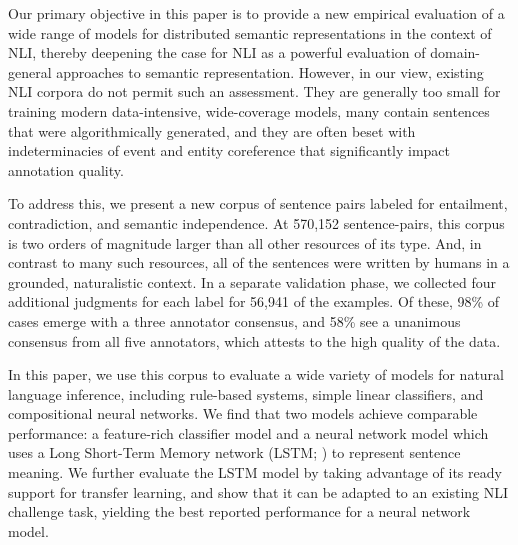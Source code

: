 Our primary objective in this paper is to provide a new empirical
evaluation of a wide range of models for distributed semantic
representations in the context of NLI, thereby deepening the case for
NLI as a powerful evaluation of domain-general approaches to semantic
representation. However, in our view, existing NLI corpora do not
permit such an assessment. They are generally too small for training
modern data-intensive, wide-coverage models, many contain sentences
that were algorithmically generated, and they are often beset with
indeterminacies of event and entity coreference that significantly
impact annotation quality.

To address this, we present a new corpus of sentence pairs labeled for
entailment, contradiction, and semantic independence. At 570,152
sentence-pairs, this corpus is two orders of magnitude larger than all
other resources of its type. And, in contrast to many such resources,
all of the sentences were written by humans in a grounded,
naturalistic context. In a separate validation phase, we collected
four additional judgments for each label for 56,941 of the examples.
Of these, 98\% of cases emerge with a three annotator consensus, 
and 58\% see a unanimous consensus from all five annotators, 
which attests to the high quality of the data.

In this paper, we use this corpus to evaluate a wide variety of models
for natural language inference, including rule-based systems, simple
linear classifiers, and compositional neural networks. 
We find that two models achieve comparable performance: a feature-rich
classifier model and a neural network model which uses a Long Short-Term Memory network (LSTM; 
\citealt{hochreiter1997long}) to represent sentence meaning. We further evaluate the LSTM model
by taking advantage of its ready support for transfer learning, and show that it can be adapted to an existing
NLI challenge task, yielding the best reported performance for a neural network model.





